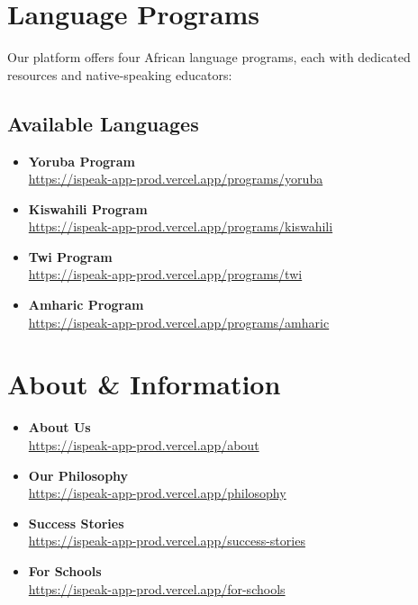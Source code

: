 \documentclass[11pt,a4paper]{article}
\begin{document}
\section{Language Programs}

Our platform offers four African language programs, each with dedicated resources and native-speaking educators:

\subsection{Available Languages}
\begin{itemize}[itemsep=0.5em]
    \item \textbf{Yoruba Program}\\
    \href{https://ispeak-app-prod.vercel.app/programs/yoruba}{https://ispeak-app-prod.vercel.app/programs/yoruba}
    
    \item \textbf{Kiswahili Program}\\
    \href{https://ispeak-app-prod.vercel.app/programs/kiswahili}{https://ispeak-app-prod.vercel.app/programs/kiswahili}
    
    \item \textbf{Twi Program}\\
    \href{https://ispeak-app-prod.vercel.app/programs/twi}{https://ispeak-app-prod.vercel.app/programs/twi}
    
    \item \textbf{Amharic Program}\\
    \href{https://ispeak-app-prod.vercel.app/programs/amharic}{https://ispeak-app-prod.vercel.app/programs/amharic}
\end{itemize}

\section{About \& Information}

\begin{itemize}[itemsep=0.5em]
    \item \textbf{About Us}\\
    \href{https://ispeak-app-prod.vercel.app/about}{https://ispeak-app-prod.vercel.app/about}
    
    \item \textbf{Our Philosophy}\\
    \href{https://ispeak-app-prod.vercel.app/philosophy}{https://ispeak-app-prod.vercel.app/philosophy}
    
    \item \textbf{Success Stories}\\
    \href{https://ispeak-app-prod.vercel.app/success-stories}{https://ispeak-app-prod.vercel.app/success-stories}
    
    \item \textbf{For Schools}\\
    \href{https://ispeak-app-prod.vercel.app/for-schools}{https://ispeak-app-prod.vercel.app/for-schools}
\end{itemize}
\end{document}
